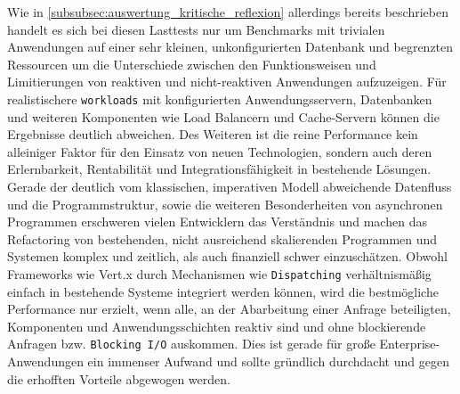 Wie in \ref{subsubsec:auswertung_kritische_reflexion} allerdings bereits beschrieben handelt es sich bei diesen Lasttests nur um
Benchmarks mit trivialen Anwendungen auf einer sehr kleinen, unkonfigurierten Datenbank und begrenzten Ressourcen um
die Unterschiede zwischen den Funktionsweisen und Limitierungen von reaktiven und nicht-reaktiven Anwendungen aufzuzeigen.
Für realistischere \verb|workloads| mit konfigurierten Anwendungsservern, Datenbanken und weiteren Komponenten wie Load Balancern und
Cache-Servern können die Ergebnisse deutlich abweichen.
Des Weiteren ist die reine Performance kein alleiniger Faktor für den Einsatz von neuen Technologien, sondern auch deren
Erlernbarkeit, Rentabilität und Integrationsfähigkeit in bestehende Lösungen.
Gerade der deutlich vom klassischen, imperativen Modell abweichende Datenfluss und die Programmstruktur, sowie die weiteren Besonderheiten
von asynchronen Programmen erschweren vielen Entwicklern das Verständnis und machen das Refactoring von bestehenden, nicht ausreichend
skalierenden Programmen und Systemen komplex und zeitlich, als auch finanziell schwer einzuschätzen.
Obwohl Frameworks wie Vert.x durch Mechanismen wie \verb|Dispatching| verhältnismäßig einfach in bestehende Systeme integriert werden
können, wird die bestmögliche Performance nur erzielt, wenn alle, an der Abarbeitung einer Anfrage beteiligten, Komponenten und
Anwendungsschichten reaktiv sind und ohne blockierende Anfragen bzw. \verb|Blocking I/O| auskommen. Dies ist gerade für
große Enterprise-Anwendungen ein immenser Aufwand und sollte gründlich durchdacht und gegen die erhofften Vorteile abgewogen werden.